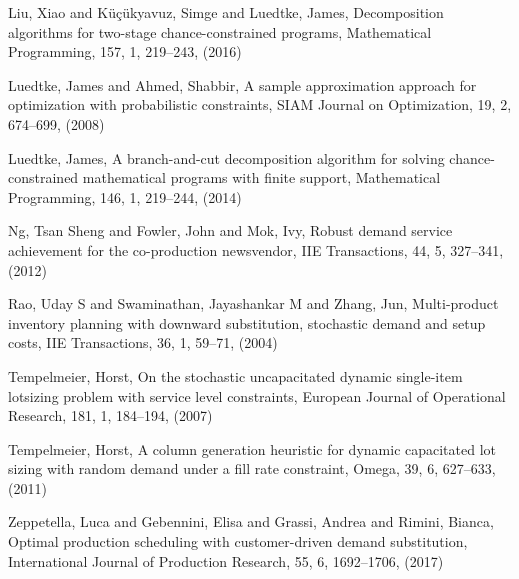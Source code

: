 \documentclass[10pt]{article}
\begin{document}
\begin{thebibliography}{99}
Liu, Xiao and K{\"u}{\c{c}}{\"u}kyavuz, Simge and Luedtke, James, 
Decomposition algorithms for two-stage chance-constrained programs, Mathematical Programming, 157,
  1, 219--243, (2016)
 

Luedtke, James and Ahmed, Shabbir, A sample approximation approach for optimization with probabilistic constraints, 
SIAM Journal on Optimization, 19,
2, 674--699, (2008)


  Luedtke, James, A branch-and-cut decomposition algorithm for solving chance-constrained mathematical programs with finite support,
  Mathematical Programming, 146, 1, 219--244,
 (2014)

Ng, Tsan Sheng and Fowler, John and Mok, Ivy, Robust demand service achievement for the co-production newsvendor, IIE Transactions,
  44,
  5,
 327--341,
  (2012)
  
 Rao, Uday S and Swaminathan, Jayashankar M and Zhang, Jun,
 Multi-product inventory planning with downward substitution, stochastic demand and setup costs,
 IIE Transactions, 36, 1, 59--71, (2004)
 
Tempelmeier, Horst, On the stochastic uncapacitated dynamic single-item lotsizing problem with service level constraints, European Journal of Operational Research, 181, 1, 184--194, (2007)
 

Tempelmeier, Horst, A column generation heuristic for dynamic capacitated lot sizing with random demand under a fill rate constraint, Omega, 39, 6, 627--633, (2011)
 

Zeppetella, Luca and Gebennini, Elisa and Grassi, Andrea and Rimini, Bianca, Optimal production scheduling with customer-driven demand substitution, International Journal of Production Research, 55, 6, 1692--1706, (2017)
 



\end{thebibliography}
\end{document}
